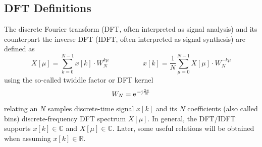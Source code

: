 \documentclass[11pt,a4paper,DIV=12]{scrartcl}
\begin{document}
\subsection{DFT Definitions}
The discrete Fourier transform (DFT, often interpreted as signal analysis) and
its counterpart the inverse DFT (IDFT, often interpreted as signal synthesis)
are defined as \cite[eq.~(8.11) and (8.12)]{Oppenheim2010}
\begin{equation}
X[\mu]=\sum_{k=0}^{N-1}x[k]\cdot W_N^{k\mu} \hspace{2cm}
x[k]=\frac{1}{N}\sum_{\mu=0}^{N-1}X[\mu]\cdot W_N^{-k\mu}
\end{equation}
using the so-called twiddle factor or DFT kernel
\begin{equation}
W_N=\e^{-\im\frac{2\pi}{N}}
\end{equation}
relating an $N$ samples discrete-time signal $x[k]$ and its $N$ coefficients
(also called bins) discrete-frequency DFT spectrum $X[\mu]$.
%
In general, the DFT/IDFT supports $x[k]\in \mathbb{C}$ and
$X[\mu]\in \mathbb{C}$.
%
Later, some useful relations will be obtained when assuming
$x[k]\in\mathbb{R}$.
\end{document}
